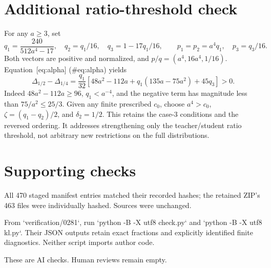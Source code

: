 \documentclass[10pt]{article}
\begin{document}
\section*{Additional ratio-threshold check}
For any \(a\ge3\), set \[q_1=\frac{240}{512a^4-17},\quad q_2=q_1/16,\quad q_3=1-17q_1/16,
\qquad p_1=p_2=a^4q_1,\quad p_3=q_3/16.\] Both vectors are positive and normalized, and \(p/q=(a^4,16a^4,1/16)\). Equation [eq:alpha] (\#eq:alpha) yields \[\Delta_{1/2}-\Delta_{1/4}
=\frac{q_1}{32}
 [48a^2-112a+q_1(135a-75a^2)+45q_3]>0.\] Indeed \(48a^2-112a\ge96\), \(q_1<a^{-4}\), and the negative term has magnitude less than \(75/a^2\le25/3\). Given any finite prescribed \(c_0\), choose \(a^4>c_0\), \(\zeta=(q_1-q_2)/2\), and \(\delta_2=1/2\). This retains the case-3 conditions and the reversed ordering. It addresses strengthening only the teacher/student ratio threshold, not arbitrary new restrictions on the full distributions.\par
\section*{Supporting checks}
All 470 staged manifest entries matched their recorded hashes; the retained ZIP’s 463 files were individually hashed. Sources were unchanged.\par
From `verification/0281`, run `python -B -X utf8 check.py` and `python -B -X utf8 kl.py`. Their JSON outputs retain exact fractions and explicitly identified finite diagnostics. Neither script imports author code.\par
These are AI checks. Human reviews remain empty.\par
\end{document}
